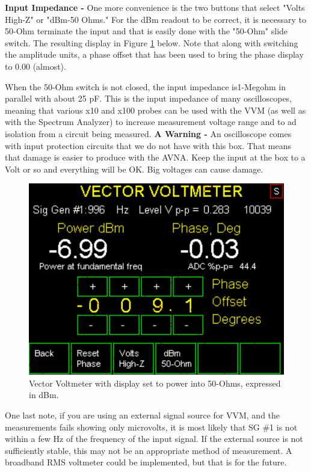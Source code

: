 \textbf{Input Impedance - }One more convenience is the two buttons that select "Volts High-Z" or "dBm-50 Ohms."  For the  dBm readout to be correct, it is necessary to 50-Ohm terminate the input and that is easily done with the "50-Ohm" slide switch.  The resulting display  in Figure  \ref{AVNA_018-label} below.  Note that along with switching the amplitude units,  a phase offset that has been used to bring the phase display to 0.00 (almost).

When the 50-Ohm switch is not closed, the input impedance is1-Megohm in parallel with about 25 pF.  This is the input impedance of many oscilloscopes, meaning that  various x10 and x100 probes can be used with the VVM (as well as with the Spectrum Analyzer) to increase measurement voltage range and to ad isolation from a circuit being measured. \textbf{A Warning - }An oscilloscope comes with input protection circuits that we do not have with this box. That means that damage is easier to produce with the AVNA. Keep the input at the box to a Volt or so and everything will be OK. Big voltages can cause damage. 
%
\begin{figure}[H]
\begin{center}
\includegraphics[scale=0.75]{./images/AVNA_018.pdf}
\caption{Vector Voltmeter with display set to power into 50-Ohms, expressed in dBm.}
\label{AVNA_018-label}
\end{center}
\end{figure}
%

One last note, if you are using an external signal source for VVM, and the measurements fails showing only microvolts, it is most likely that SG \#1 is not within a few Hz of the frequency of the input signal.  If the external source is not sufficiently stable, this may not be an appropriate method of measurement.  A broadband RMS voltmeter could be implemented, but that is for the future.

